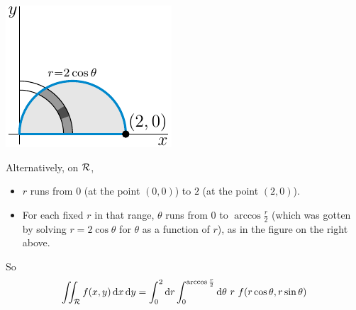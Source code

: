 \begin{solution}
\begin{center}
     \includegraphics{fig/polar5e3.pdf}
\end{center}
Alternatively, on $\mathcal{R}$,
\begin{itemize}
\item 
$r$ runs from $0$ (at the point $(0,0)$)  
to $2$ (at the point $(2,0)$). 
\item
For each fixed $r$ in that range, $\theta$ runs 
from $0$ to $\arccos\frac{r}{2}$ (which was gotten by solving 
$r=2\cos\theta$ for $\theta$ as a function of $r$), as in the figure 
on the right above.
\end{itemize}
So 
\begin{equation*}
\iint_{\mathcal{R}} f(x,y)\,\mathrm{d}x\,\mathrm{d}y
=\int_0^2\mathrm{d}r
  \int_0^{\arccos\frac{r}{2}}\mathrm{d}\theta
 \ r\ f(r\cos\theta,r\sin\theta)
\end{equation*}



\end{solution}

